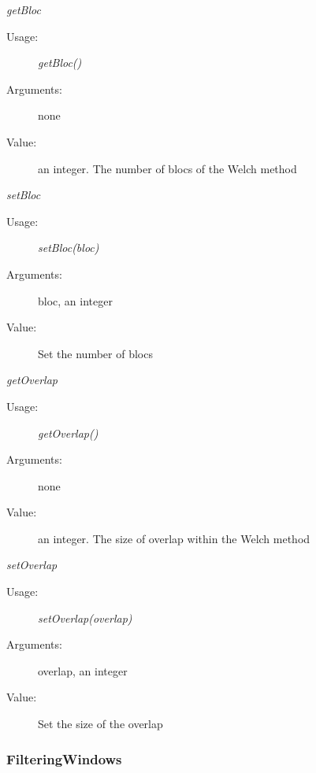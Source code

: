 \begin{description}
\begin{description}
\item \textit{getBloc}
\begin{description}
\item[Usage:] \textit{getBloc()}
\item[Arguments:] none
\item[Value:]  an integer. The number of blocs of the Welch method
\end{description}
\bigskip

\item \textit{setBloc}
\begin{description}
\item[Usage:] \textit{setBloc(bloc)}
\item[Arguments:] bloc, an integer
\item[Value:]  Set the number of blocs
\end{description}
\bigskip

\item \textit{getOverlap}
\begin{description}
\item[Usage:] \textit{getOverlap()}
\item[Arguments:] none
\item[Value:]  an integer. The size of overlap within the Welch method
\end{description}
\bigskip

\item \textit{setOverlap}
\begin{description}
\item[Usage:] \textit{setOverlap(overlap)}
\item[Arguments:] overlap, an integer
\item[Value:]  Set the size of the overlap
\end{description}
\bigskip

\end{description}


\end{description}


\newpage
\subsubsection{FilteringWindows}


